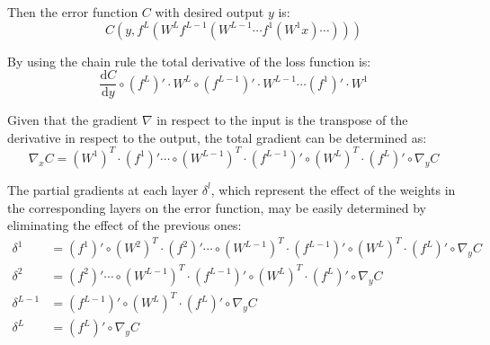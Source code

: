 Then the error function \(C\) with desired output \(y\) is:
\begin{equation}
    C \left( y , 
    f^L \left( W^L f^{L-1} \left( W^{L-1} \cdots 
    f^1 \left(  W^1 x \right) \cdots \right) \right) 
    \right)
	\label{eqn:Backpropagation, loss function}
\end{equation}

By using the chain rule the total derivative of the loss function is:
\begin{equation}
    \frac{\mathrm{d}C}{\mathrm{d}y} \circ 
    \left( f^L \right)' \cdot W^L 
    \circ \left( f^{L-1} \right)' \cdot W^{L-1} \cdots 
    \left( f^{1} \right)' \cdot W^{1}
	\label{eqn:Backpropagation, total derivative of the loss function}
\end{equation}

Given that the gradient \(\nabla \) in respect to the input is the transpose of the derivative in respect to the output, the total gradient can be determined as:
\begin{equation}
    \nabla_x C =
        \left( W^{1} \right)^T \cdot \left( f^{1} \right)' \cdots \circ
        \left( W^{L-1} \right)^T \cdot \left( f^{L-1} \right)' \circ
        \left( W^{L} \right)^T \cdot \left( f^{L} \right)' \circ
        \nabla_y C
	\label{eqn:Backpropagation, total gradient}
\end{equation}

The partial gradients at each layer \( \delta^l \), which represent the effect of the weights in the corresponding layers on the error function, may be easily determined by eliminating the effect of the previous ones:
\begin{equation}
    \begin{split} 
        \delta^{1} & = 
            \left( f^{1} \right)' \circ 
            \left( W^{2} \right)^T \cdot \left( f^{2} \right)' \cdots \circ
            \left( W^{L-1} \right)^T \cdot \left( f^{L-1} \right)' \circ
            \left( W^{L} \right)^T \cdot \left( f^{L} \right)' \circ
            \nabla_y C\\
        \delta^{2} & =
            \left( f^{2} \right)' \cdots \circ
            \left( W^{L-1} \right)^T \cdot \left( f^{L-1} \right)' \circ
            \left( W^{L} \right)^T \cdot \left( f^{L} \right)' \circ
            \nabla_y C\\
        \delta^{L-1} & =
            \left( f^{L-1} \right)' \circ
            \left( W^{L} \right)^T \cdot \left( f^{L} \right)' \circ
            \nabla_y C\\
        \delta^{L} & =
            \left( f^{L} \right)' \circ
            \nabla_y C\\
    \end{split}
	\label{eqn:Backpropagation, per layer gradient}
\end{equation}

